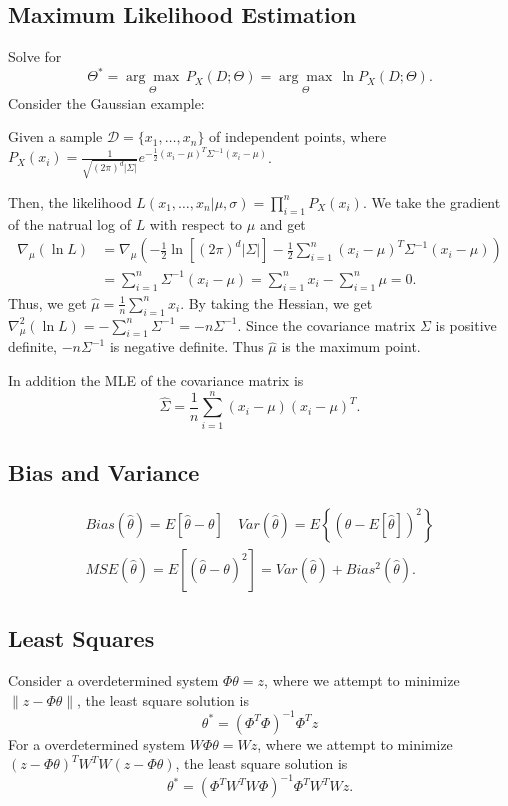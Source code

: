 \documentclass{article}
\newenvironment{topic}[1]{\subsection*{#1}}{}
\begin{document}
\begin{topic}{Maximum Likelihood Estimation}
    Solve for
    \[
        \Theta^* = \underset{\Theta}{\arg \max} \, P_X(D;\Theta) = \underset{\Theta}{\arg \max} \, \ln P_X(D;\Theta).
    \]
    Consider the Gaussian example: 
    
    Given a sample $\mathcal{D} = \{x_1, \dots , x_n\}$ of independent points, where $P_X(x_i) = \frac{1}{\sqrt{(2\pi)^d|\Sigma|}}e^{-\frac{1}{2}(x_i - \mu)^T\Sigma^{-1}(x_i - \mu)}$.

    Then, the likelihood $L(x_1, \dots, x_n|\mu, \sigma) = \prod_{i = 1}^n P_X(x_i)$.
    We take the gradient of the natrual log of $L$ with respect to $\mu$ and get
    \begin{align*}
        \nabla_{\mu} (\ln L) 
        &= \nabla_{\mu} \left(-\frac{1}{2}\ln[(2\pi)^d|\Sigma|] - \frac{1}{2} \sum_{i = 1}^n (x_i - \mu)^T\Sigma^{-1}(x_i - \mu)\right) \\
        &= \sum_{i = 1}^n \Sigma^{-1}(x_i - \mu) = \sum_{i = 1}^n x_i - \sum_{i = 1}^n \mu  = 0.
    \end{align*}
    Thus, we get $\hat{\mu} = \frac{1}{n}\sum_{i = 1}^n x_i$. 
    By taking the Hessian, we get $\nabla_{\mu}^2(\ln L) = -\sum_{i = 1}^n \Sigma^{-1} = -n\Sigma^{-1}$.
    Since the covariance matrix $\Sigma$ is positive definite, $-n\Sigma^{-1}$ is negative definite. Thus $\hat{\mu}$ is the maximum point.

    In addition the MLE of the covariance matrix is
    \[
        \hat{\Sigma} = \frac{1}{n}\sum_{i = 1}^n (x_i - \mu)(x_i - \mu)^T.
    \]
\end{topic}

\begin{topic}{Bias and Variance}
    \begin{gather*}
        Bias(\hat{\theta}) = E[\hat{\theta} - \theta] \quad Var(\hat{\theta}) = E\left\{(\hat{\theta} - E[\hat{\theta}])^2\right\} \\
        MSE(\hat{\theta}) = E\left[(\hat{\theta} - \theta)^2\right] = Var(\hat{\theta}) + Bias^2(\hat{\theta}).
    \end{gather*}
\end{topic}

\begin{topic}{Least Squares}
    Consider a overdetermined system $\Phi\theta = z$, where we attempt to minimize $\lVert z - \Phi\theta \rVert$, the least square solution is
    \[
        \theta^* = (\Phi^T\Phi)^{-1}\Phi^Tz
    \]
    For a overdetermined system $W\Phi\theta = Wz$, where we attempt to minimize $(z - \Phi\theta)^TW^TW(z - \Phi\theta)$, the least square solution is
    \[
        \theta^* = (\Phi^TW^TW\Phi)^{-1}\Phi^TW^TWz.
    \]
\end{topic}

 
\end{document}
